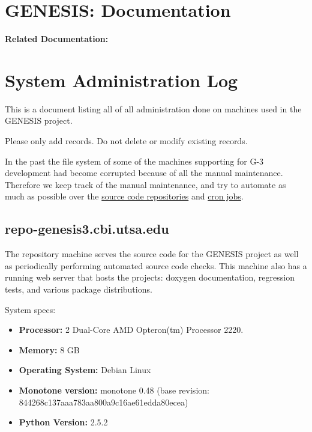 \documentclass[12pt]{article}
\begin{document}
\section*{GENESIS: Documentation}

{\bf Related Documentation:}

\section*{System Administration Log}

This is a document listing all of all administration done on machines
used in the GENESIS project.

Please only add records.  Do not delete or modify existing records.

In the past the file system of some of the machines supporting for G-3
development had become corrupted because of all the manual
maintenance.  Therefore we keep track of the manual maintenance, and
try to automate as much as possible over the
\href{../version-control/version-control.tex}{source code
  repositories} and
\href{../neurospaces-cron/neurospaces-cron.tex}{cron jobs}.

\subsection*{repo-genesis3.cbi.utsa.edu}

The repository machine serves the source code for the GENESIS project
as well as periodically performing automated source code checks. This
machine also has a running web server that hosts the projects: doxygen
documentation, regression tests, and various package distributions.

System specs:
\begin{itemize}
\item[] {\bf Processor:} 2 Dual-Core AMD Opteron(tm) Processor 2220.
\item[] {\bf Memory:} 8 GB
\item[] {\bf Operating System:} Debian Linux
\item[] {\bf Monotone version:} monotone 0.48 (base revision:
  844268c137aaa783aa800a9c16ae61edda80ecea)
\item[]{\bf Python Version:} 2.5.2
\end{itemize}
\end{document}
